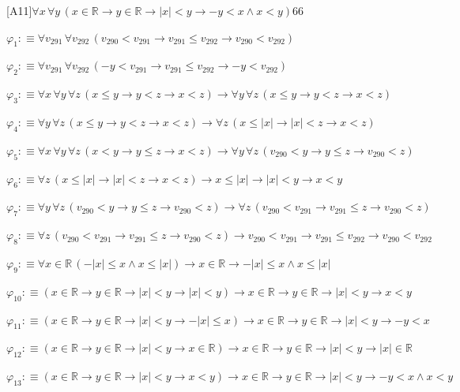 \begin{fullproof}{[A11]}{$\forall x\,\forall y\,(x \in \mathbb{R} \to y \in \mathbb{R} \to \lvert x \rvert < y \to -y < x \land x < y)$}{66}
\begin{abbrevlist}
\item $\varphi_{1} :\equiv \forall v_{291}\,\forall v_{292}\,(v_{290} < v_{291} \to v_{291} \leq v_{292} \to v_{290} < v_{292})$
\item $\varphi_{2} :\equiv \forall v_{291}\,\forall v_{292}\,(-y < v_{291} \to v_{291} \leq v_{292} \to -y < v_{292})$
\item $\varphi_{3} :\equiv \forall x\,\forall y\,\forall z\,(x \leq y \to y < z \to x < z) \to \forall y\,\forall z\,(x \leq y \to y < z \to x < z)$
\item $\varphi_{4} :\equiv \forall y\,\forall z\,(x \leq y \to y < z \to x < z) \to \forall z\,(x \leq \lvert x \rvert \to \lvert x \rvert < z \to x < z)$
\item $\varphi_{5} :\equiv \forall x\,\forall y\,\forall z\,(x < y \to y \leq z \to x < z) \to \forall y\,\forall z\,(v_{290} < y \to y \leq z \to v_{290} < z)$
\item $\varphi_{6} :\equiv \forall z\,(x \leq \lvert x \rvert \to \lvert x \rvert < z \to x < z) \to x \leq \lvert x \rvert \to \lvert x \rvert < y \to x < y$
\item $\varphi_{7} :\equiv \forall y\,\forall z\,(v_{290} < y \to y \leq z \to v_{290} < z) \to \forall z\,(v_{290} < v_{291} \to v_{291} \leq z \to v_{290} < z)$
\item $\varphi_{8} :\equiv \forall z\,(v_{290} < v_{291} \to v_{291} \leq z \to v_{290} < z) \to v_{290} < v_{291} \to v_{291} \leq v_{292} \to v_{290} < v_{292}$
\item $\varphi_{9} :\equiv \forall x \in \mathbb{R}\,(-\lvert x \rvert \leq x \land x \leq \lvert x \rvert) \to x \in \mathbb{R} \to -\lvert x \rvert \leq x \land x \leq \lvert x \rvert$
\item $\varphi_{10} :\equiv (x \in \mathbb{R} \to y \in \mathbb{R} \to \lvert x \rvert < y \to \lvert x \rvert < y) \to x \in \mathbb{R} \to y \in \mathbb{R} \to \lvert x \rvert < y \to x < y$
\item $\varphi_{11} :\equiv (x \in \mathbb{R} \to y \in \mathbb{R} \to \lvert x \rvert < y \to -\lvert x \rvert \leq x) \to x \in \mathbb{R} \to y \in \mathbb{R} \to \lvert x \rvert < y \to -y < x$
\item $\varphi_{12} :\equiv (x \in \mathbb{R} \to y \in \mathbb{R} \to \lvert x \rvert < y \to x \in \mathbb{R}) \to x \in \mathbb{R} \to y \in \mathbb{R} \to \lvert x \rvert < y \to \lvert x \rvert \in \mathbb{R}$
\item $\varphi_{13} :\equiv (x \in \mathbb{R} \to y \in \mathbb{R} \to \lvert x \rvert < y \to x < y) \to x \in \mathbb{R} \to y \in \mathbb{R} \to \lvert x \rvert < y \to -y < x \land x < y$

\end{abbrevlist}
\end{fullproof}
